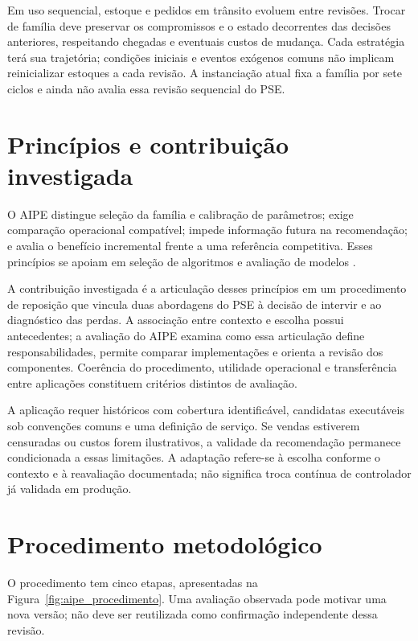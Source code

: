 Em uso sequencial, estoque e pedidos em trânsito evoluem entre revisões. Trocar de família deve preservar os compromissos e o estado decorrentes das decisões anteriores, respeitando chegadas e eventuais custos de mudança. Cada estratégia terá sua trajetória; condições iniciais e eventos exógenos comuns não implicam reinicializar estoques a cada revisão. A instanciação atual fixa a família por sete ciclos e ainda não avalia essa revisão sequencial do PSE.

\section{Princípios e contribuição investigada}
O AIPE distingue seleção da família e calibração de parâmetros; exige comparação operacional compatível; impede informação futura na recomendação; e avalia o benefício incremental frente a uma referência competitiva. Esses princípios se apoiam em seleção de algoritmos e avaliação de modelos \citep{Rice1976AlgorithmSelection,Kerschke2019AutomatedAlgorithmSelection,CawleyTalbot2010}.

A contribuição investigada é a articulação desses princípios em um procedimento de reposição que vincula duas abordagens do PSE à decisão de intervir e ao diagnóstico das perdas. A associação entre contexto e escolha possui antecedentes; a avaliação do AIPE examina como essa articulação define responsabilidades, permite comparar implementações e orienta a revisão dos componentes. Coerência do procedimento, utilidade operacional e transferência entre aplicações constituem critérios distintos de avaliação.

A aplicação requer históricos com cobertura identificável, candidatas executáveis sob convenções comuns e uma definição de serviço. Se vendas estiverem censuradas ou custos forem ilustrativos, a validade da recomendação permanece condicionada a essas limitações. A adaptação refere-se à escolha conforme o contexto e à reavaliação documentada; não significa troca contínua de controlador já validada em produção.

\section{Procedimento metodológico}
\label{sec:procedimento_aipe}
O procedimento tem cinco etapas, apresentadas na Figura~\ref{fig:aipe_procedimento}. Uma avaliação observada pode motivar uma nova versão; não deve ser reutilizada como confirmação independente dessa revisão.

